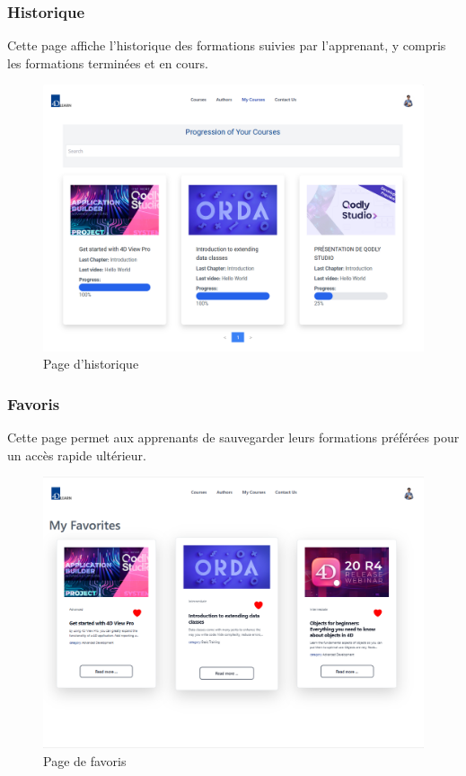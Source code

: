 \subsubsection{Historique}

Cette page affiche l'historique des formations suivies par l'apprenant, y compris les formations terminées et en cours.

\begin{figure}[H]
    \centering
    \includegraphics[width=19cm]{Figures/historique.png}
    \caption{ Page d'historique}
\end{figure}

\subsubsection{Favoris}

Cette page permet aux apprenants de sauvegarder leurs formations préférées pour un accès rapide ultérieur.

\begin{figure}[H]
    \centering
    \includegraphics[width=19cm]{Figures/favoris.png}
    \caption{ Page de favoris}
\end{figure}

